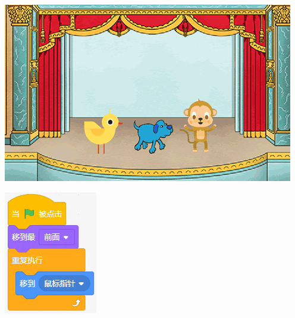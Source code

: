 \documentclass[10pt, a4paper]{article}
\begin{document}
\begin{enumerate}
        \begin{minipage}{.2\textwidth}
            \centering
            \includegraphics[width=\textwidth]{figure/22-1.png}
        \end{minipage}
        \begin{minipage}{.1\textwidth}
            \centering
            \includegraphics[width=\textwidth]{figure/22-2.png}

\end{minipage}
\end{enumerate}
\end{document}
